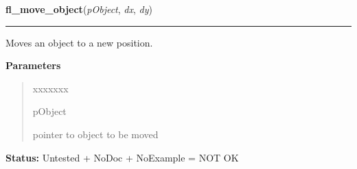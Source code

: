 \hspace{.8\funcindent}\begin{boxedminipage}{\funcwidth}

    \raggedright \textbf{fl\_move\_object}(\textit{pObject}, \textit{dx}, \textit{dy})

    \vspace{-1.5ex}

    \rule{\textwidth}{0.5\fboxrule}
\setlength{\parskip}{2ex}
    Moves an object to a new position.

\setlength{\parskip}{1ex}
      \textbf{Parameters}
      \vspace{-1ex}

      \begin{quote}
        \begin{Ventry}{xxxxxxx}

          \item[pObject]

          pointer to object to be moved

        \end{Ventry}

      \end{quote}

\textbf{Status:} Untested + NoDoc + NoExample = NOT OK



    \end{boxedminipage}

    \label{xformslib:library:fl_fit_object_label}

    \vspace{0.5ex}

